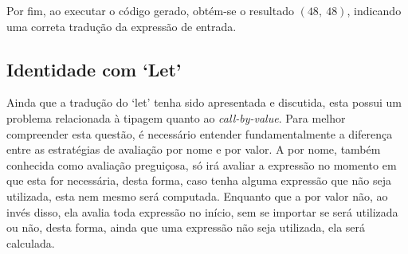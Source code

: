 Por fim, ao executar o código gerado, obtém-se o resultado $(48,\ 48)$, indicando uma correta tradução da expressão de entrada.
\subsection{Identidade com `Let'}
Ainda que a tradução do `let' tenha sido apresentada e discutida, esta possui um problema relacionada à tipagem quanto ao \textit{call-by-value}.
Para melhor compreender esta questão, é necessário entender fundamentalmente a diferença entre as estratégias de avaliação por nome e por valor.
A por nome, também conhecida como avaliação preguiçosa, só irá avaliar a expressão no momento em que esta for necessária, desta forma, caso tenha alguma expressão que não seja utilizada, esta nem mesmo será computada.
Enquanto que a por valor não, ao invés disso, ela avalia toda expressão no início, sem se importar se será utilizada ou não, desta forma, ainda que uma expressão não seja utilizada, ela será calculada.

